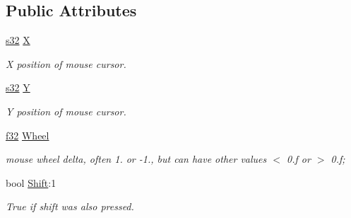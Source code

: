 \subsection*{Public Attributes}
\begin{DoxyCompactItemize}
\item 
\mbox{\label{structirr_1_1SEvent_1_1SMouseInput_a8d1f2d8281cc8982eff089b580f58e86}} 
\hyperlink{namespaceirr_ac66849b7a6ed16e30ebede579f9b47c6}{s32} \hyperlink{structirr_1_1SEvent_1_1SMouseInput_a8d1f2d8281cc8982eff089b580f58e86}{X}
\begin{DoxyCompactList}\small\item\em X position of mouse cursor. \end{DoxyCompactList}\item 
\mbox{\label{structirr_1_1SEvent_1_1SMouseInput_a274d984da2c05655589bd13c4e71e5a3}} 
\hyperlink{namespaceirr_ac66849b7a6ed16e30ebede579f9b47c6}{s32} \hyperlink{structirr_1_1SEvent_1_1SMouseInput_a274d984da2c05655589bd13c4e71e5a3}{Y}
\begin{DoxyCompactList}\small\item\em Y position of mouse cursor. \end{DoxyCompactList}\item 
\hyperlink{namespaceirr_a0277be98d67dc26ff93b1a6a1d086b07}{f32} \hyperlink{structirr_1_1SEvent_1_1SMouseInput_a0821c616196a7ffcc574e68c060b6d18}{Wheel}
\begin{DoxyCompactList}\small\item\em mouse wheel delta, often 1. or -\/1., but can have other values $<$ 0.\+f or $>$ 0.\+f; \end{DoxyCompactList}\item 
\mbox{\label{structirr_1_1SEvent_1_1SMouseInput_afa1f5dca47f1378ccc27157ba225feda}} 
bool \hyperlink{structirr_1_1SEvent_1_1SMouseInput_afa1f5dca47f1378ccc27157ba225feda}{Shift}\+:1
\begin{DoxyCompactList}\small\item\em True if shift was also pressed. \end{DoxyCompactList}\item 
\mbox{\label{structirr_1_1SEvent_1_1SMouseInput_a2b0cf7a5d52c4489dbfc739fe62aa354}} 

\end{DoxyCompactItemize}

